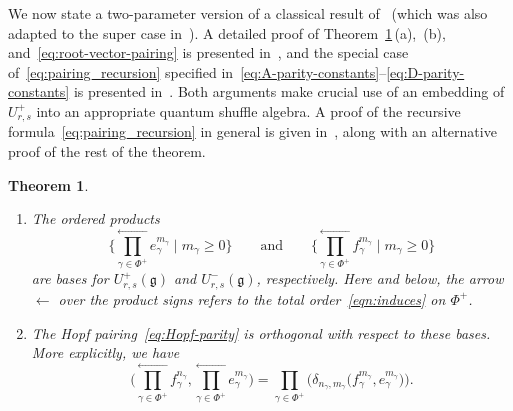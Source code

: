 \documentclass[10pt,a4paper]{amsart}
\numberwithin{equation}{section}
\newtheorem{Theorem}{Theorem}[section]
\begin{document}
We now state a two-parameter version of a classical result of~\cite{K1,K2,L,Ro} (which was also adapted to the super case in~\cite{CHW}). A detailed proof of Theorem~\ref{thm:PBW-general}\,(a),~(b), and~\eqref{eq:root-vector-pairing} is presented in~\cite[Theorem~7.1]{MT1}, and the special case of~\eqref{eq:pairing_recursion} specified in~\eqref{eq:A-parity-constants}--\eqref{eq:D-parity-constants} is presented in~\cite[Theorem~7.2]{MT1}. Both arguments make crucial use of an embedding of $U_{r,s}^{+}$ into an appropriate quantum shuffle algebra. A proof of the recursive formula~\eqref{eq:pairing_recursion} in general is given in~\cite{MT2}, along with an alternative proof of the rest of the theorem.

\begin{Theorem}\label{thm:PBW-general}\samepage \quad
\begin{enumerate}\itemsep=0pt
\item[$(a)$] The ordered products
\begin{displaymath}
 \Biggl\{ \overset{\longleftarrow}{\underset{\gamma \in \Phi^{+}}{\prod}} e_{\gamma}^{m_{\gamma}} \mid m_{\gamma} \ge 0 \Biggr\}\qquad \text{and}\qquad \Biggl\{\overset{\longleftarrow}{\underset{\gamma \in \Phi^{+}}{\prod}}f_{\gamma}^{m_{\gamma}} \mid m_{\gamma} \ge 0\Biggr\}
\end{displaymath}
are bases for $U_{r,s}^{+}(\mathfrak{g})$ and $U_{r,s}^{-}(\mathfrak{g})$, respectively. Here and below, the arrow $\leftarrow$ over the product signs refers to the total order~\eqref{eqn:induces} on $\Phi^+$.


\item[$(b)$] The Hopf pairing~\eqref{eq:Hopf-parity} is orthogonal with respect to these bases. More explicitly, we have
\begin{displaymath}
 \Biggl(\overset{\longleftarrow}{\underset{\gamma \in \Phi^{+}}{\prod}} f_{\gamma}^{n_{\gamma}}, \overset{\longleftarrow}{\underset{\gamma \in \Phi^{+}}{\prod}} e_{\gamma}^{m_{\gamma}}\Biggr)=
 \prod_{\gamma\in \Phi^+} \bigl(\delta_{n_\gamma,m_\gamma} \bigl(f_{\gamma}^{m_\gamma},e^{m_\gamma}_\gamma\bigr)\bigr).
\end{displaymath}



\end{enumerate}
\end{Theorem}
\end{document}
